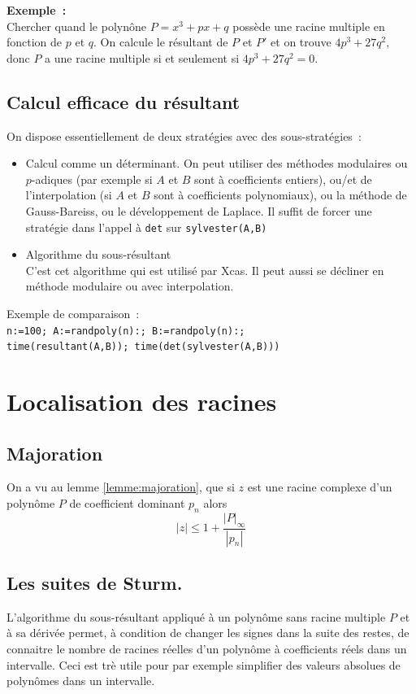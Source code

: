 \documentclass[a4paper,11pt]{article}
\begin{document}
{\bf Exemple~:}\\ 
Chercher quand le polyn\^one $P=x^3+px+q$ poss\`ede
une racine multiple en fonction de $p$ et $q$. On calcule le
r\'esultant de $P$ et $P'$ et on trouve $4p^3+27q^2$, donc $P$
a une racine multiple si et seulement si $4p^3+27q^2=0$.

\subsection{Calcul efficace du r\'esultant}
On dispose essentiellement de deux strat\'egies avec des sous-strat\'egies~:
\begin{itemize}
\item Calcul comme un d\'eterminant.
On peut utiliser des m\'ethodes modulaires ou $p$-adiques (par exemple
si $A$ et $B$ sont \`a coefficients entiers), ou/et de l'interpolation
(si $A$ et $B$ sont \`a coefficients polynomiaux), ou la m\'ethode
de Gauss-Bareiss, ou le d\'eveloppement de Laplace. Il suffit
de forcer une strat\'egie dans l'appel \`a \verb|det| sur
\verb|sylvester(A,B)|
\item Algorithme du sous-r\'esultant\\
C'est cet algorithme qui est utilis\'e par Xcas.
Il peut aussi se d\'ecliner en m\'ethode modulaire ou avec interpolation.
\end{itemize}
Exemple de comparaison~:\\
\verb|n:=100; A:=randpoly(n):; B:=randpoly(n):;|\\
\verb|time(resultant(A,B)); time(det(sylvester(A,B)))|

\section{Localisation des racines} \label{sec:racines}
\subsection{Majoration}
On a vu au lemme \ref{lemme:majoration}, 
que si $z$ est une racine complexe d'un polyn\^ome $P$ 
de coefficient dominant $p_n$ alors
$$ |z| \leq 1 + \frac{|P|_\infty}{|p_n|}$$ 

\subsection{Les suites de Sturm.}
L'algorithme du sous-r\'esultant appliqu\'e \`a un polyn\^ome sans
racine multiple $P$ et \`a sa d\'eriv\'ee
permet, \`a condition de changer les signes dans la suite des restes, 
de connaitre le nombre de racines r\'eelles d'un polyn\^ome 
\`a coefficients r\'eels dans un 
intervalle. Ceci est tr\`e utile pour par exemple simplifier des valeurs
absolues de polyn\^omes dans un intervalle.
\end{document}
